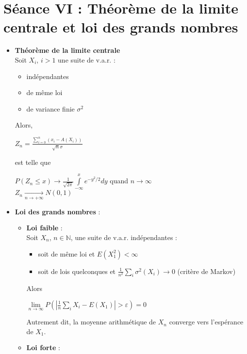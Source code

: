 \documentclass[a4paper,11pt]{report}
\begin{document}
\section{Séance VI : Théorème de la limite centrale et loi des grands nombres}
\begin{itemize}
	\item \textbf{Théorème de la limite centrale} \\
	Soit $X_i$, $i>1$ une suite de v.a.r. :
	\begin{itemize}
		\item indépendantes
		\item de même loi
		\item de variance finie $\sigma^2$
	\end{itemize}
	Alors,\\
	\begin{center}
	$Z_n = \frac{\sum\limits_{i=0}^{n}{(x_i-A(X_i))}}{\sqrt{n}\sigma}$
	\end{center}
	est telle que\\
	\begin{center}
	$P(Z_n \le x) \rightarrow \frac{1}{\sqrt{2\pi}}\int\limits_{-\infty}^{x}{e^{-y^2/2}dy}$ quand $n\rightarrow \infty$\\
	$Z_n \underset{n\to+\infty}{\longrightarrow} N(0,1)$
	\end{center}
	\item \textbf{Loi des grands nombres} : \\
	\begin{itemize}
		\item \textbf{Loi faible} :\\
		Soit $X_n$, $n \in \mathbb{N}$, une suite de v.a.r. indépendantes :
		\begin{itemize}
			\item soit de même loi et $E(X_1^2) < \infty$
			\item soit de lois quelconques et $\frac{1}{n^2}\sum\limits_{i}{\sigma^2(X_i) \rightarrow 0}$ (critère de Markov)
		\end{itemize}
		Alors\\
		\begin{center}
		$\lim\limits_{n\rightarrow \infty}{P(|\frac{1}{n}\sum\limits_{i}{X_i}-E(X_1)|>\varepsilon)} = 0$\\
		\end{center}
		Autrement dit, la moyenne arithmétique de $X_n$ converge vers l'espérance de $X_1$.\\
		\item \textbf{Loi forte} :\\

\end{itemize}
\end{itemize}
\end{document}
